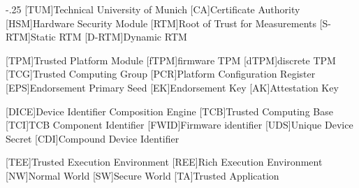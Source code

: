 \documentclass[headsepline,footsepline,footinclude=false,fontsize=11pt,paper=a4,listof=totoc,bibliography=totoc,BCOR=12mm,DIV=12]{scrbook} %
\begin{document}


\frontmatter{}





\tableofcontents{}

\mainmatter{}

%








\appendix{}


\begin{acronym}
	\itemsep-.25\baselineskip
	[TUM]{Technical University of Munich}
	[CA]{Certificate Authority}
	[HSM]{Hardware Security Module}
	[RTM]{Root of Trust for Measurements}
	[S-RTM]{Static \ac{RTM}}
	[D-RTM]{Dynamic \ac{RTM}}

	[TPM]{Trusted Platform Module}
	[fTPM]{firmware TPM}
	[dTPM]{discrete TPM}
	[TCG]{Trusted Computing Group}
	[PCR]{Platform Configuration Register}
	[EPS]{Endorsement Primary Seed}
	[EK]{Endorsement Key}
	[AK]{Attestation Key}

	[DICE]{Device Identifier Composition Engine}
	[TCB]{Trusted Computing Base}
	[TCI]{TCB Component Identifier}
	[FWID]{Firmware identifier}
	[UDS]{Unique Device Secret}
	[CDI]{Compound Device Identifier}

	[TEE]{Trusted Execution Environment}
	[REE]{Rich Execution Environment}
	[NW]{Normal World}
	[SW]{Secure World}
	[TA]{Trusted Application}
\end{acronym}

\listoffigures{}
\listoftables{}
\printbibliography{}
\end{document}
